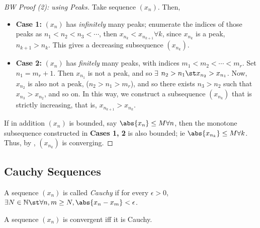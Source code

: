 \documentclass[12pt]{article}
\begin{document}
\begin{proof}[BW Proof (2): using Peaks]
  Take sequence $(x_n)$. Then,
  \begin{itemize}
    \item \textbf{Case 1:} $(x_n)$ has \textit{infinitely} many peaks; enumerate the indices of those peaks as $n_1 < n_2 < n_3 < \cdots$, then $x_{n_k} < x_{n_{k+1}} \forall k$, since $x_{n_k}$ is a peak, $n_{k+1} > n_k$.  This gives a decreasing subsequence $(x_{n_k})$.
    \item \textbf{Case 2:} $(x_n)$ has \textit{finitely} many peaks, with indices $m_1 < m_2 < \cdots < m_r$. Set $n_1 = m_r + 1$. Then $x_{n_1}$ is not a peak, and so $\exists$ $n_2 > n_1 \st x_{n_2} > x_{n_1}$. Now, $x_{n_2}$ is also not a peak, ($n_2 > n_1 > m_r$), and so there exists $n_3 > n_2$ such that $x_{n_3} > x_{n_2}$, and so on. In this way, we construct a subsequence $(x_{n_k})$ that is strictly increasing, that is, $x_{n_{k+1}} > x_{n_k}$.
  \end{itemize}
  If in addition $(x_n)$ is bounded, say $\abs{x_n} \leq M \forall n$, then the monotone subsequence constructed in \textbf{Cases 1, 2} is also bounded; ie $\abs{x_{n_k}} \leq M \forall k$. Thus, by , $(x_{n_k})$ is converging.
\end{proof}

\subsection{Cauchy Sequences}
\begin{definition}\label{def:cauchydefinition}
  A sequence $(x_n)$ is called \emph{Cauchy} if for every $\epsilon > 0$, $\exists N \in \mathbb{N} \st \forall n, m \geq N, \abs{x_n - x_m} < \epsilon$. 
\end{definition}

\begin{theorem}\label{thm:cauchyconvergence}
  A sequence $(x_n)$ is convergent iff it is Cauchy.\footnotemark
\end{theorem}

\end{document}
